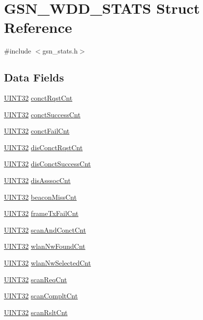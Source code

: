 \hypertarget{a00301}{
\section{GSN\_\-WDD\_\-STATS Struct Reference}
\label{a00301}
}


{\ttfamily \#include $<$gsn\_\-stats.h$>$}

\subsection*{Data Fields}
\begin{DoxyCompactItemize}
\item 
\hyperlink{a00660_gae1e6edbbc26d6fbc71a90190d0266018}{UINT32} \hyperlink{a00301_a3d46a252d29d27f41d12d517af34da1c}{conctRqstCnt}
\item 
\hyperlink{a00660_gae1e6edbbc26d6fbc71a90190d0266018}{UINT32} \hyperlink{a00301_a9bbf8d7d7248d76b305feea88cdb0bc1}{conctSuccessCnt}
\item 
\hyperlink{a00660_gae1e6edbbc26d6fbc71a90190d0266018}{UINT32} \hyperlink{a00301_a15ff019dfbe98340d6dcd15155c3b53c}{conctFailCnt}
\item 
\hyperlink{a00660_gae1e6edbbc26d6fbc71a90190d0266018}{UINT32} \hyperlink{a00301_a85a32f1234768ac2dff45471f1c6ce21}{disConctRqstCnt}
\item 
\hyperlink{a00660_gae1e6edbbc26d6fbc71a90190d0266018}{UINT32} \hyperlink{a00301_a8d35eccf66881d1e2462f6e7d6170ed5}{disConctSuccessCnt}
\item 
\hyperlink{a00660_gae1e6edbbc26d6fbc71a90190d0266018}{UINT32} \hyperlink{a00301_a8547634d0532fee8cdb7e2bc3390e335}{disAsssocCnt}
\item 
\hyperlink{a00660_gae1e6edbbc26d6fbc71a90190d0266018}{UINT32} \hyperlink{a00301_a00a24b43af4dd333f89259b25ed7aaef}{beaconMissCnt}
\item 
\hyperlink{a00660_gae1e6edbbc26d6fbc71a90190d0266018}{UINT32} \hyperlink{a00301_a986d5aa380acb3f636e724d3711b71a8}{frameTxFailCnt}
\item 
\hyperlink{a00660_gae1e6edbbc26d6fbc71a90190d0266018}{UINT32} \hyperlink{a00301_a31ec231419f5b7f737ab1b40a51e76e0}{scanAndConctCnt}
\item 
\hyperlink{a00660_gae1e6edbbc26d6fbc71a90190d0266018}{UINT32} \hyperlink{a00301_aa605b13b3c3c599175872366ac82733a}{wlanNwFoundCnt}
\item 
\hyperlink{a00660_gae1e6edbbc26d6fbc71a90190d0266018}{UINT32} \hyperlink{a00301_ad59017b297ed3bffb771d9f07f92939d}{wlanNwSelectedCnt}
\item 
\hyperlink{a00660_gae1e6edbbc26d6fbc71a90190d0266018}{UINT32} \hyperlink{a00301_a8c34d8207b71d4cc5880cd1a3bdb8d1e}{scanReqCnt}
\item 
\hyperlink{a00660_gae1e6edbbc26d6fbc71a90190d0266018}{UINT32} \hyperlink{a00301_a3ce276030f25433e1cc4f5458c7c1879}{scanCompltCnt}
\item 
\hyperlink{a00660_gae1e6edbbc26d6fbc71a90190d0266018}{UINT32} \hyperlink{a00301_a81e1efdce4f7abc685aeced74cdf5999}{scanRsltCnt}
\end{DoxyCompactItemize}


